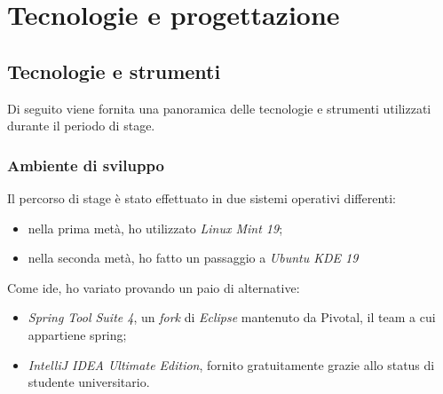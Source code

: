 
\chapter{Tecnologie e progettazione}
\label{cap:progettazione-codifica}


\section{Tecnologie e strumenti}
\label{sec:tecnologie-strumenti}

Di seguito viene fornita una panoramica delle tecnologie e strumenti utilizzati durante il periodo di stage.


\subsection{Ambiente di sviluppo}
Il percorso di stage è stato effettuato in due sistemi operativi differenti:
\begin{itemize}
	\item nella prima metà, ho utilizzato \textit{Linux Mint 19};
	\item nella seconda metà, ho fatto un passaggio a \textit{Ubuntu KDE 19}
\end{itemize}

Come \acrshort{ide}, ho variato provando un paio di alternative:
\begin{itemize}
	\item \textit{Spring Tool Suite 4}, un \textit{fork} di \textit{Eclipse} mantenuto da Pivotal, il team a cui appartiene \gls{spring};
	\item \textit{IntelliJ IDEA Ultimate Edition}, fornito gratuitamente grazie allo status di studente universitario.
\end{itemize} 

